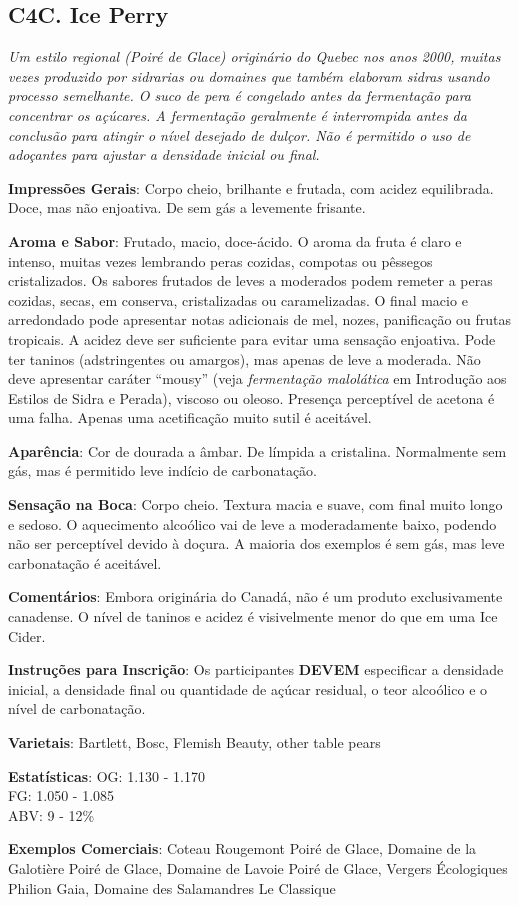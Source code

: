 \subsection*{C4C. Ice Perry}

\textit{Um estilo regional (\textit{Poiré de Glace}) originário do Quebec nos anos 2000, muitas vezes produzido por sidrarias ou domaines que também elaboram sidras usando processo semelhante. O suco de pera é congelado antes da fermentação para concentrar os açúcares. A fermentação geralmente é interrompida antes da conclusão para atingir o nível desejado de dulçor. Não é permitido o uso de adoçantes para ajustar a densidade inicial ou final.}

\textbf{Impressões Gerais}: Corpo cheio, brilhante e frutada, com acidez equilibrada. Doce, mas não enjoativa. De sem gás a levemente frisante.

\textbf{Aroma e Sabor}: Frutado, macio, doce-ácido. O aroma da fruta é claro e intenso, muitas vezes lembrando peras cozidas, compotas ou pêssegos cristalizados. Os sabores frutados de leves a moderados podem remeter a peras cozidas, secas, em conserva, cristalizadas ou caramelizadas. O final macio e arredondado pode apresentar notas adicionais de mel, nozes, panificação ou frutas tropicais. A acidez deve ser suficiente para evitar uma sensação enjoativa. Pode ter taninos (adstringentes ou amargos), mas apenas de leve a moderada. Não deve apresentar caráter “mousy” (veja \textit{fermentação malolática} em Introdução aos Estilos de Sidra e Perada), viscoso ou oleoso. Presença perceptível de acetona é uma falha. Apenas uma acetificação muito sutil é aceitável.

\textbf{Aparência}: Cor de dourada a âmbar. De límpida a cristalina. Normalmente sem gás, mas é permitido leve indício de carbonatação.

\textbf{Sensação na Boca}: Corpo cheio. Textura macia e suave, com final muito longo e sedoso. O aquecimento alcoólico vai de leve a moderadamente baixo, podendo não ser perceptível devido à doçura. A maioria dos exemplos é sem gás, mas leve carbonatação é aceitável.

\textbf{Comentários}: Embora originária do Canadá, não é um produto exclusivamente canadense. O nível de taninos e acidez é visivelmente menor do que em uma Ice Cider.

\textbf{Instruções para Inscrição}: Os participantes \textbf{DEVEM} especificar a densidade inicial, a densidade final ou quantidade de açúcar residual, o teor alcoólico e o nível de carbonatação.

\textbf{Varietais}: Bartlett, Bosc, Flemish Beauty, other table pears

\textbf{Estatísticas}: OG: 1.130 - 1.170 \\
\phantom{ } \hspace{16.5mm} FG: 1.050 - 1.085 \\
\phantom{ } \hspace{16.5mm} ABV: 9 - 12\%

\textbf{Exemplos Comerciais}: Coteau Rougemont Poiré de Glace, Domaine de la Galotière Poiré de Glace, Domaine de Lavoie Poiré de Glace, Vergers Écologiques Philion Gaia, Domaine des Salamandres Le Classique
